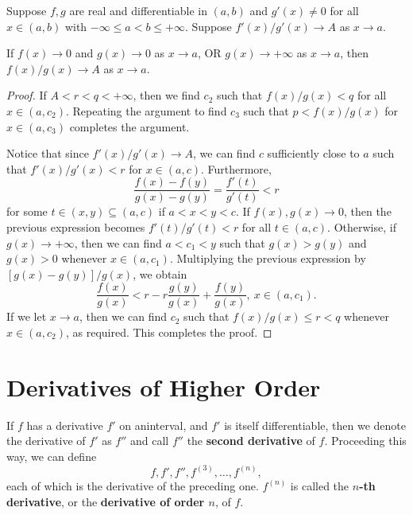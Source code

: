 \begin{theorem} %
    Suppose $f, g$ are real and differentiable in $(a, b)$ and $g'(x) \ne 0$ for all $x \in (a, b)$ with $-\infty \le a < b \le +\infty$. Suppose $f'(x) / g'(x) \to A$ as $x \to a$.

    If $f(x) \to 0$ and $g(x) \to 0$ as $x \to a$, OR $g(x) \to +\infty$ as $x \to a$, then $f(x) / g(x) \to A$ as $x \to a$.

    \begin{proof}
        If $A < r < q < +\infty$, then we find $c_2$ such that $f(x) / g(x) < q$ for all $x \in (a, c_2)$. Repeating the argument to find $c_3$ such that $p < f(x) / g(x)$ for $x \in (a, c_3)$ completes the argument.

        Notice that since $f'(x) / g'(x) \to A$, we can find $c$ sufficiently close to $a$ such that $f'(x) / g'(x) < r$ for $x \in (a, c)$. Furthermore, 
        \[
            \frac{f(x) - f(y)}{g(x) - g(y)} = \frac{f'(t)}{g'(t)} < r
        \]
        for some $t \in (x, y) \subseteq (a, c)$ if $a < x < y < c$. If $f(x), g(x) \to 0$, then the previous expression becomes $f'(t) / g'(t) < r$ for all $t \in (a, c)$. Otherwise, if $g(x) \to +\infty$, then we can find $a < c_1 < y$ such that $g(x) > g(y)$ and $g(x) > 0$ whenever $x \in (a, c_1)$. Multiplying the previous expression by $[g(x) - g(y)] / g(x)$, we obtain
        \[
            \frac{f(x)}{g(x)} < r - r\frac{g(y)}{g(x)} + \frac{f(y)}{g(x)},\ x \in (a, c_1).
        \]
        If we let $x \to a$, then we can find $c_2$ such that $f(x) / g(x) \le r < q$ whenever $x \in (a, c_2)$, as required. This completes the proof.
    \end{proof}
\end{theorem}

\section{Derivatives of Higher Order}

\begin{definition} %
    If $f$ has a derivative $f'$ on aninterval, and $f'$ is itself differentiable, then we denote the derivative of $f'$ as $f''$ and call $f''$ the \textbf{second derivative} of $f$. Proceeding this way, we can define 
    \[
        f, f', f'', f^{(3)}, \dotsc, f^{(n)},
    \]
    each of which is the derivative of the preceding one. $f^{(n)}$ is called the \textbf{$n$-th derivative}, or the \textbf{derivative of order $n$}, of $f$.
\end{definition}

